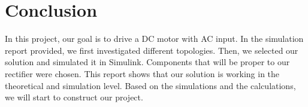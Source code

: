 \section{Conclusion}
In this project, our goal is to drive a DC motor with AC input. In the simulation report provided, we first investigated different topologies. Then, we selected our solution and simulated it in Simulink. Components that will be proper to our rectifier were chosen. This report shows that our solution is working in the theoretical and simulation level. Based on the simulations and the calculations, we will start to construct our project.